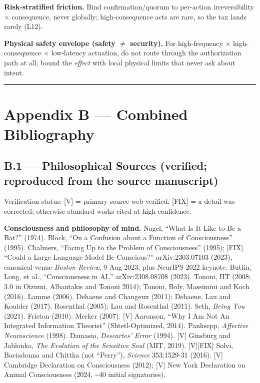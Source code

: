 \documentclass[11pt]{article}
\begin{document}
\textbf{Risk-stratified friction.} Bind confirmation/\allowbreak{}quorum to per-action irreversibility × consequence, never globally; high-consequence acts are rare, so the tax lands rarely (L12).

\textbf{Physical safety envelope (safety \ensuremath{\neq} security).} For high-frequency × high-consequence × low-latency actuation, do not route through the authorization path at all; bound the \emph{effect} with local physical limits that never ask about intent.

\medskip\noindent\rule{\linewidth}{0.3pt}\medskip

\section*{Appendix B — Combined Bibliography}

\subsection*{B.1 — Philosophical Sources (verified; reproduced from the source manuscript)}

Verification status: [V] = primary-source web-verified; [FIX] = a detail was corrected; otherwise standard works cited at high confidence.

\textbf{Consciousness and philosophy of mind.} Nagel, ``What Is It Like to Be a Bat?'' (1974). Block, ``On a Confusion about a Function of Consciousness'' (1995). Chalmers, ``Facing Up to the Problem of Consciousness'' (1995); [FIX] ``Could a Large Language Model Be Conscious?'' arXiv:2303.07103 (2023), canonical venue \emph{Boston Review}, 9 Aug 2023, plus NeurIPS 2022 keynote. Butlin, Long, et al., ``Consciousness in AI,'' arXiv:2308.08708 (2023). Tononi, IIT (2008; 3.0 in Oizumi, Albantakis and Tononi 2014); Tononi, Boly, Massimini and Koch (2016). Lamme (2006). Dehaene and Changeux (2011); Dehaene, Lau and Kouider (2017). Rosenthal (2005); Lau and Rosenthal (2011). Seth, \emph{Being You} (2021). Friston (2010). Merker (2007). [V] Aaronson, ``Why I Am Not An Integrated Information Theorist'' (Shtetl-Optimized, 2014). Panksepp, \emph{Affective Neuroscience} (1998). Damasio, \emph{Descartes' Error} (1994). [V] Ginsburg and Jablonka, \emph{The Evolution of the Sensitive Soul} (MIT, 2019). [V][FIX] Solvi, Baciadonna and Chittka (not ``Perry''), \emph{Science} 353:1529-31 (2016). [V] Cambridge Declaration on Consciousness (2012); [V] New York Declaration on Animal Consciousness (2024, \textasciitilde{}40 initial signatories).
\end{document}

